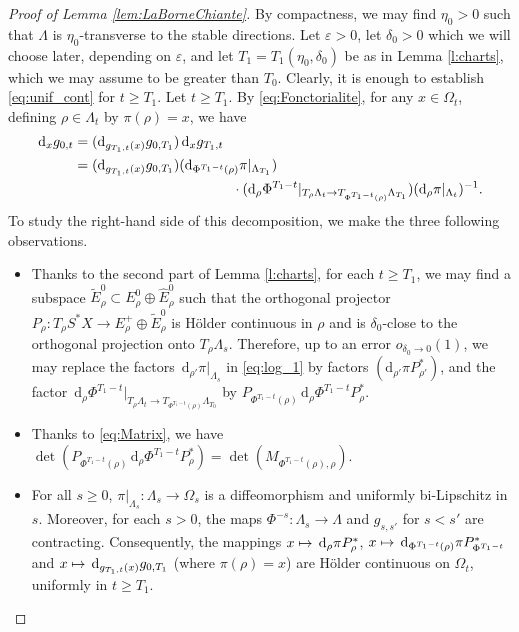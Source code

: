 \documentclass[JEP,XML,SOM,Unicode,published]{cedram}
\newcommand\mto{\mathchoice{\longmapsto}{\mapsto}{\mapsto}{\mapsto}}
\newcommand{\sd}{\mathrm{d}}
\newcommand{\rd}{\,\mathrm{d}}
\theoremstyle{plain}
\theoremstyle{definition}
\begin{document}
\begin{proof}[Proof of Lemma \ref{lem:LaBorneChiante}]
By compactness, we may find $\eta_0>0$ such that $\Lambda$ is $\eta_0$\nobreakdash-trans\-verse to the stable directions. Let $\varepsilon>0$, let $\delta_0>0$ which we will choose later, depending on $\varepsilon$, and let $T_1=T_1(\eta_0,\delta_0)$ be as in Lemma \ref{l:charts}, which we may assume to be greater than $T_0$. Clearly, it is enough to establish \eqref{eq:unif_cont} for $t\geq T_1$. Let $t\geq T_1$. By \eqref{eq:Fonctorialite}, for any $x\in\Omega_t$, defining $\rho\in\Lambda_t$ by $\pi(\rho)=x$, we have\vspace*{-3pt}
\begin{equation}\label{eq:log_1}
\begin{aligned}
\rd _xg_{0,t}&=(\sd _{g_{T_1,t}(x)}g_{0,T_1}) \rd _xg_{T_1,t}\\
&=(\sd _{g_{T_1,t}(x)}g_{0,T_1}) (\sd _{\Phi^{T_1-t}(\rho)}\pi|_{\Lambda_{T_1}})\\
&\hspace*{4cm}\cdot(\sd _\rho \Phi^{T_1-t}|_{T_\rho\Lambda_t\to T_{\Phi^{T_1-t}(\rho)}\Lambda_{T_1}}) (\sd _\rho\pi|_{\Lambda_t})^{-1}.
\end{aligned}
\end{equation}
To study the right-hand side of this decomposition, we make the three following observations.
\begin{itemize}
\item Thanks to the second part of Lemma \ref{l:charts}, for each $t\geq T_1$, we may find a subspace $\tilde{E}^0_\rho \subset E_\rho^0\oplus \hat{E}_\rho^0$ such that the orthogonal projector $P_\rho:T_\rho S^*X\to E_\rho^+\oplus \tilde{E}_\rho^0$ is Hölder continuous in $\rho$ and is $\delta_0$-close to the orthogonal projection onto $T_\rho\Lambda_s$. Therefore, up to an error $o_{\delta_0\to 0}(1)$, we may replace the factors $\rd _{\rho'}\pi|_{\Lambda_s}$ in \eqref{eq:log_1} by factors $(\sd _{\rho'}\pi P_{\rho'}^*)$, and the factor $\rd _\rho \Phi^{T_1-t}|_{T_\rho\Lambda_t\to T_{\Phi^{T_1-t}(\rho)}\Lambda_{T_0}}$ by $P_{\Phi^{T_1-t}(\rho)}\rd _\rho\Phi^{T_1-t} P_\rho^*$.

\item Thanks to \eqref{eq:Matrix}, we have $\det(P_{\Phi^{T_1-t}(\rho)}\rd _\rho\Phi^{T_1-t} P_\rho^*) = \det(M_{\Phi^{T_1-t}(\rho), \rho})$.

\item For all $s\geq 0$, $\pi|_{\Lambda_s}:\Lambda_s\to \Omega_s$ is a diffeomorphism and uniformly bi-Lipschitz in $s$. Moreover, for each $s>0$, the maps $\Phi^{-s}:\Lambda_s\to\Lambda$ and $g_{s,s'}$ for $s<s'$ are contracting. Consequently, the mappings $x\mto \rd _\rho\pi P_\rho^*$, $x\mto \rd _{\Phi^{T_1-t}(\rho)}\pi P_{\Phi^{T_1-t}}^*$ and $x\mto \rd _{g_{T_1,t}(x)}g_{0,T_1}$ (where $\pi(\rho)=x$) are Hölder continuous on $\Omega_t$, uniformly in $t\geq T_1$.
\end{itemize}


\end{proof}
\end{document}
